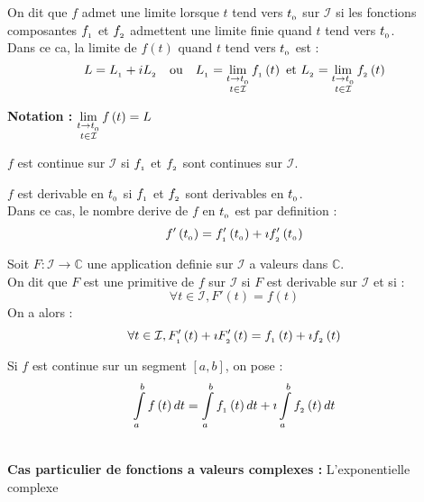 \documentclass[12pt,twoside,a4paper]{article}
\begin{document}
		\begin{defi}
			\begin{liste}
				\item On dit que $f$ admet une limite lorsque $t$ tend vers $t_{_{0}}$ sur $\mathcal{I}$ si les fonctions composantes $f_{_{1}}$ et $f_{_{2}}$ admettent une limite finie quand $t$ tend vers $t_{_{0}}$. \\
					Dans ce ca, la limite de $f\left(t\right)$ quand $t$ tend vers $t_{_{0}}$ est : \\
					$$
						L=L\uu1+iL\uu2\ \ \ \text{ou}\ \ \ L\uu1=\lim\limits_{\substack{t\rightarrow t\uu0\\t\in\mathcal{I}}}f\uu1\left(t\right)\ \text{et}\ L\uu2=\lim\limits_{\substack{t\rightarrow t\uu0\\t\in\mathcal{I}}}f\uu2\left(t\right)
					$$
			\end{liste}
			\textbf{Notation :} $\lim\limits_{\substack{t\rightarrow t_{_{0}}\\t\in\mathcal{I}}}f\left(t\right)=L$
			\begin{liste}
				\item $f$ est continue sur $\mathcal{I}$ si $f_{_{1}}$ et $f_{_{2}}$ sont continues sur $\mathcal{I}$.
				\item $f$ est derivable en $t_{_{0}}$ si $f_{_{1}}$ et $f_{_{2}}$ sont derivables en $t_{_{0}}$. \\
					Dans ce cas, le nombre derive de $f$ en $t_{_{0}}$ est par definition :
					$$
						f'\left(t_{_{0}}\right)=f_{_{1}}'\left(t_{_{0}}\right)+\imath f_{_{2}}'\left(t_{_{0}}\right)
					$$
				\item Soit $F\colon\mathcal{I}\longrightarrow\mathbb{C}$ une application definie sur $\mathcal{I}$ a valeurs dans $\mathbb{C}$. \\
					On dit que $F$ est une primitive de $f$ sur $\mathcal{I}$ si $F$ est derivable sur $\mathcal{I}$ et si :
					$$\forall t\in\mathcal{I},F'\left(t\right)=f\left(t\right)$$
					On a alors :
					$$\forall t\in\mathcal{I},F_{_{1}}'\left(t\right)+\imath F_{_{2}}'\left(t\right)=f_{_{1}}\left(t\right)+\imath f_{_{2}}\left(t\right)$$
				\item Si $f$ est continue sur un segment $\left[a,b\right]$, on pose :
					$$\int\limits_{a}^bf\left(t\right)dt=\int\limits_{a}^bf_{_{1}}\left(t\right)dt+\imath\int\limits_{a}^bf_{_{2}}\left(t\right)dt$$
			\end{liste}
		\end{defi}\ \\
		\textbf{Cas particulier de fonctions a valeurs complexes :} L'exponentielle complexe \\
\end{document}
